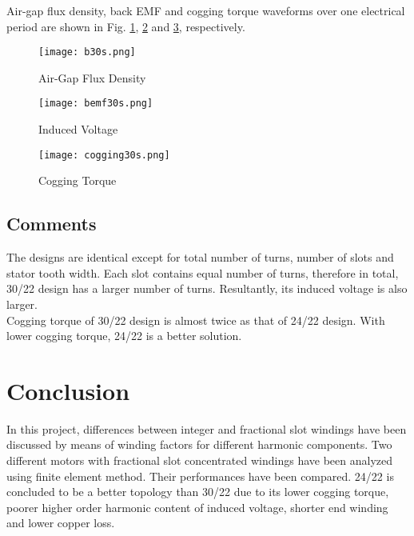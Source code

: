 \documentclass{reportClass}
\begin{document}
Air-gap flux density, back EMF and cogging torque waveforms over one electrical period are shown in Fig. \ref{fig:b30}, \ref{fig:bemf30} and \ref{fig:cog30}, respectively.\\


\begin{figure}[h!]
    \centering
    \texttt{[image: b30s.png]}
    \caption{Air-Gap Flux Density}
    \label{fig:b30}
\end{figure}

\begin{figure}[h!]
    \centering
    \texttt{[image: bemf30s.png]}
    \caption{Induced Voltage}
    \label{fig:bemf30}
\end{figure}

\begin{figure}[h!]
    \centering
    \texttt{[image: cogging30s.png]}
    \caption{Cogging Torque}
    \label{fig:cog30}
\end{figure}

\subsection{Comments}
The designs are identical except for total number of turns, number of slots and stator tooth width. Each slot contains equal number of turns, therefore in total, 30/22 design has a larger number of turns. Resultantly, its induced voltage is also larger.\\

Cogging torque of 30/22 design is almost twice as that of 24/22 design. With lower cogging torque, 24/22 is a better solution.\\


\section{Conclusion}

In this project, differences between integer and fractional slot windings have been discussed by means of winding factors for different harmonic components. Two different motors with fractional slot concentrated windings have been analyzed using finite element method. Their performances have been compared. 24/22 is concluded to be a better topology than 30/22 due to its lower cogging torque, poorer higher order harmonic content of induced voltage, shorter end winding and lower copper loss.
\end{document}
